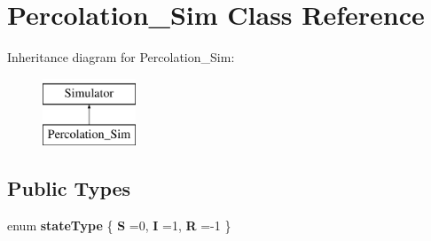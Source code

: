 \hypertarget{classPercolation__Sim}{}\section{Percolation\+\_\+\+Sim Class Reference}
\label{classPercolation__Sim}
Inheritance diagram for Percolation\+\_\+\+Sim\+:\begin{figure}[H]
\begin{center}
\leavevmode
\includegraphics[height=2.000000cm]{classPercolation__Sim}
\end{center}
\end{figure}
\subsection*{Public Types}
\begin{DoxyCompactItemize}
\item 
\hypertarget{classPercolation__Sim_ae2805212eff0710bffa6cf55d0c31917}{}enum {\bfseries state\+Type} \{ {\bfseries S} =0, 
{\bfseries I} =1, 
{\bfseries R} =-\/1
 \}\label{classPercolation__Sim_ae2805212eff0710bffa6cf55d0c31917}

\end{DoxyCompactItemize}
